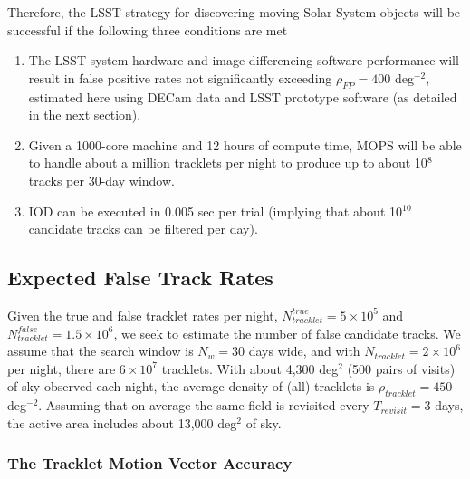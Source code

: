 Therefore, the LSST strategy for discovering moving Solar System objects will be successful
 if the following three conditions are met
\begin{enumerate}
\item The LSST system hardware and image differencing software performance will result in false positive 
          rates not significantly exceeding $\rho_{FP} =  400$ deg$^{-2}$, estimated here using DECam data
          and LSST prototype software (as detailed in the next section). 
\item Given a 1000-core machine and 12 hours of compute time, MOPS will be able to handle about 
          a million tracklets per night to produce up to about 10$^8$ tracks per 30-day window. 
\item IOD can be executed in 0.005 sec per trial (implying that about 10$^{10}$ candidate tracks can
          be filtered per day). 
\end{enumerate}



\newpage

\subsection{Expected False Track Rates \label{sec:tracks} }


Given the true and false tracklet rates per night,  $N_{tracklet}^{true}=5\times10^5$ and $N_{tracklet}^{false}=
1.5\times10^6$, we seek to estimate the number of false candidate tracks. We assume that the search 
window is $N_w= 30$ days wide, and with $N_{tracklet} = 2\times10^6$ per night, there are $6\times10^7$
tracklets. With about 4,300 deg$^2$ (500 pairs of visits) of sky observed each night, the average density of 
(all) tracklets is $\rho_{tracklet} = 450$ deg$^{-2}$. Assuming that on average the same field is 
revisited every $T_{revisit}=3$ days, the active area includes about 13,000 deg$^2$ of sky. 


\subsubsection{The Tracklet Motion Vector Accuracy} 
 
